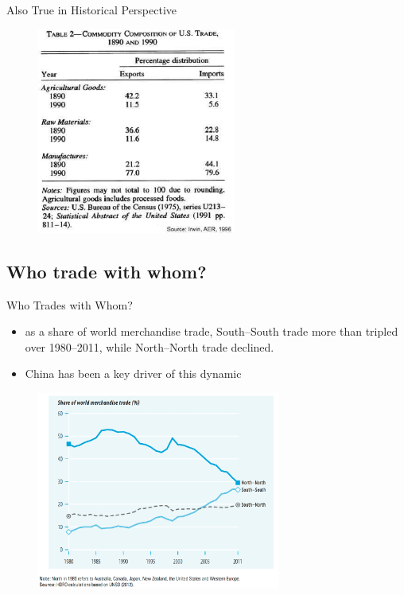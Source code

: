 \documentclass[10pt,hyperref={CJKbookmarks=true},xcolor=dvipsnames,aspectratio=169]{beamer}
\begin{document}
\begin{frame}{Also True in Historical Perspective}


\begin{figure}


\begin{centering}
\includegraphics[width=6.5cm]{fig/gravity/tra4}
\par\end{centering}

\end{figure}

\end{frame}
\subsection[贸易的国别结构]{Who trade with whom?}

\begin{frame}{Who Trades with Whom?}

\begin{itemize}
	\item as a share of world merchandise trade, South–South trade more than tripled over 1980–2011, while North–North trade declined.
	\item China has been a key driver of this dynamic 
\end{itemize}

\begin{figure}
	
	
	\begin{centering}
		\includegraphics[width=8cm]{fig/gravity/SouthSouth_HDR2013}
		\par\end{centering}
	
\end{figure}


\end{frame}
\end{document}
